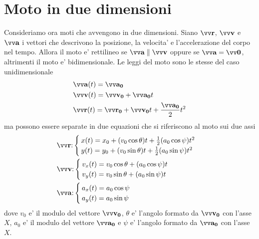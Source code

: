 \section{Moto in due dimensioni}
Consideriamo ora moti che avvengono in due dimensioni.
Siano $\bvv{r}$, $\bvv{v}$ e $\bvv{a}$ i vettori che descrivono la posizione, la velocita' e l'accelerazione del corpo nel tempo.
Allora il moto e' rettilineo se $\bvv{a} \parallel \bvv{v}$ oppure se $\bvv{a} = \bvv{0}$, altrimenti il moto e' bidimensionale.
Le leggi del moto sono le stesse del caso unidimensionale
\begin{subequations}
\begin{align}
    &\bvv{a}(t) = \bvv{a_0} \\
    &\bvv{v}(t) = \bvv{v_0} + \bvv{a_0}t \\
    &\bvv{r}(t) = \bvv{r_0} + \bvv{v_0}t + \frac{\bvv{a_0}}{2}t^2
\end{align}
\end{subequations}
ma possono essere separate in due equazioni che si riferiscono al moto sui due assi
\begin{subequations}
    \begin{align}
        &\bvv{r}\text{:}
        \begin{cases}{}
            x(t) = x_0 + (v_0\cos{\theta})t + \frac{1}{2}(a_0\cos{\psi})t^2 \\
            y(t) = y_0 + (v_0\sin{\theta})t + \frac{1}{2}(a_0\sin{\psi})t^2
        \end{cases} \\
        &\bvv{v}\text{:}
        \begin{cases}{}
            v_x(t) = v_0\cos{\theta} + (a_0\cos{\psi})t \\
            v_y(t) = v_0\sin{\theta} + (a_0\sin{\psi})t
        \end{cases} \\
        &\bvv{a}\text{:}
        \begin{cases}{}
            a_x(t) = a_0\cos{\psi} \\
            a_y(t) = a_0\sin{\psi}
        \end{cases}
    \end{align}
\end{subequations}
dove $v_0$ e' il modulo del vettore $\bvv{v_0}$, $\theta$ e' l'angolo formato da $\bvv{v_0}$ con l'asse $X$, 
$a_0$ e' il modulo del vettore $\bvv{a_0}$ e $\psi$ e' l'angolo formato da $\bvv{a_0}$ con l'asse $X$.

